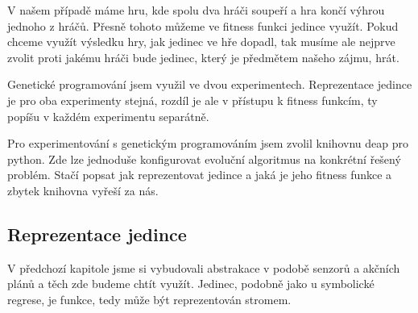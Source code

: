 V našem případě máme hru, kde spolu dva hráči soupeří a hra končí výhrou jednoho z hráčů.
Přesně tohoto můžeme ve fitness funkci jedince využít. 
Pokud chceme využít výsledku hry, jak jedinec ve hře dopadl, tak musíme ale nejprve zvolit proti jakému hráči bude jedinec, který je předmětem našeho zájmu, hrát.

Genetické programování jsem využil ve dvou experimentech. 
Reprezentace jedince je pro oba experimenty stejná, rozdíl je ale v přístupu k fitness funkcím, ty popíšu v každém experimentu separátně.

Pro experimentování s genetickým programováním jsem zvolil knihovnu deap pro python. Zde lze jednoduše konfigurovat evoluční algoritmus na konkrétní řešený problém.
Stačí popsat jak reprezentovat jedince a jaká je jeho fitness funkce a zbytek knihovna vyřeší za nás.


\subsection{Reprezentace jedince}
V předchozí kapitole jsme si vybudovali abstrakace v podobě senzorů a akčních plánů a těch zde budeme chtít využít.
Jedinec, podobně jako u symbolické regrese, je funkce, tedy může být reprezentován stromem.

